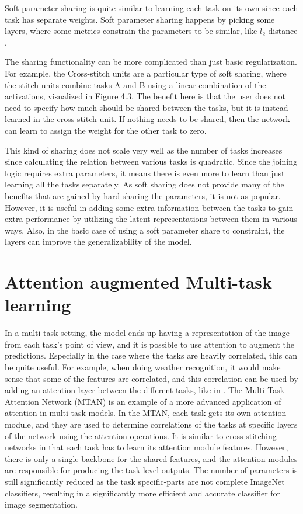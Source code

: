 Soft parameter sharing is quite similar to learning each task on its own since each task has separate weights. 
Soft parameter sharing happens by picking some layers, where some metrics constrain the parameters to be similar, like ${l_2}$ distance \citep{ruderOverview}. 

The sharing functionality can be more complicated than just basic regularization. 
For example, the Cross-stitch units \citep{crossStitch} are a particular type of soft sharing, where the stitch units combine tasks A and B using a linear combination of the activations, visualized in Figure 4.3. 
The benefit here is that the user does not need to specify how much should be shared between the tasks, but it is instead learned in the cross-stitch unit. 
If nothing needs to be shared, then the network can learn to assign the weight for the other task to zero.

This kind of sharing does not scale very well as the number of tasks increases since calculating the relation between various tasks is quadratic. 
Since the joining logic requires extra parameters, it means there is even more to learn than just learning all the tasks separately. 
As soft sharing does not provide many of the benefits that are gained by hard sharing the parameters, it is not as popular.
However, it is useful in adding some extra information between the tasks to gain extra performance by utilizing the latent representations between them in various ways.
Also, in the basic case of using a soft parameter share to constraint, the layers can improve the generalizability of the model.

\section{Attention augmented Multi-task learning}
In a multi-task setting, the model ends up having a representation of the image from each task's point of view, and it is possible to use attention \citep{attention} to augment the predictions.
Especially in the case where the tasks are heavily correlated, this can be quite useful.
For example, when doing weather recognition, it would make sense that some of the features are correlated, and this correlation can be used by adding an attention layer between the different tasks, like in \citep{cnn-rnn}.
The Multi-Task Attention Network (MTAN) \citep{multiTaskAttention} is an example of a more advanced application of attention in multi-task models.
In the MTAN, each task gets its own attention module, and they are used to determine correlations of the tasks at specific layers of the network using the attention operations.
It is similar to cross-stitching networks in that each task has to learn its attention module features. 
However, there is only a single backbone for the shared features, and the attention modules are responsible for producing the task level outputs.
The number of parameters is still significantly reduced as the task specific-parts are not complete ImageNet classifiers, resulting in a significantly more efficient and accurate classifier for image segmentation.

